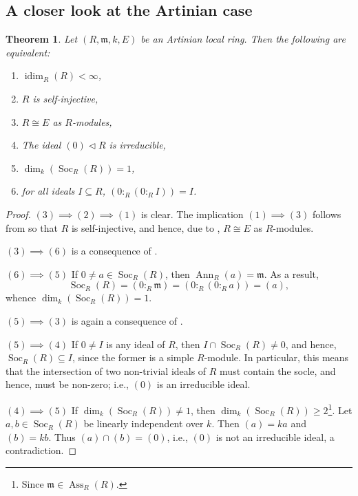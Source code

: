 \documentclass[10pt]{article}
\theoremstyle{thmstyle}
\newtheorem{theorem}{Theorem}[section]
\theoremstyle{defstyle}
\newcommand{\Ann}{\operatorname{Ann}}
\newcommand{\frakm}{\mathfrak{m}} %
\renewcommand{\ge}{\geqslant}
\newcommand{\idim}{\operatorname{idim}}
\newcommand{\nor}{\vartriangleleft}
\newcommand{\Soc}{\operatorname{Soc}}
\newcommand{\Ass}{\operatorname{Ass}}
\begin{document}
\subsection{A closer look at the Artinian case}

\begin{theorem}
    Let $(R,\frakm,k, E)$ be an Artinian local ring. Then the following are equivalent: 
    \begin{enumerate}[label=(\arabic*)]
        \item $\idim_R(R) < \infty$,
        \item $R$ is self-injective,
        \item $R\cong E$ as $R$-modules,
        \item The ideal $(0)\nor R$ is irreducible,
        \item $\dim_k\left(\Soc_R(R)\right) = 1$,
        \item for all ideals $I\subseteq R$, $\left(0 :_R \left(0 :_R I\right)\right) = I$.
    \end{enumerate}
\end{theorem}
\begin{proof}
    $(3)\implies(2)\implies(1)$ is clear. The implication $(1)\implies(3)$ follows from  so that $R$ is self-injective, and hence, due to , $R\cong E$ as $R$-modules.

    $(3)\implies(6)$ is a consequence of .

    $(6)\implies(5)$ If $0\ne a\in\Soc_R(R)$, then $\Ann_R(a) = \frakm$. As a result, 
    \begin{equation*}
        \Soc_R(R) = \left(0:_R \frakm\right) = \left(0:_R\left(0:_R a\right)\right) = (a),
    \end{equation*}
    whence $\dim_k\left(\Soc_R(R)\right) = 1$. 

    $(5)\implies(3)$ is again a consequence of .

    $(5)\implies(4)$ If $0\ne I$ is any ideal of $R$, then $I\cap\Soc_R(R)\ne 0$, and hence, $\Soc_R(R)\subseteq I$, since the former is a simple $R$-module. In particular, this means that the intersection of two non-trivial ideals of $R$ must contain the socle, and hence, must be non-zero; i.e., $(0)$ is an irreducible ideal. 

    $(4)\implies(5)$ If $\dim_k\left(\Soc_R(R)\right)\ne 1$, then $\dim_k\left(\Soc_R(R)\right)\ge 2$\footnote{Since $\frakm\in\Ass_R(R)$.}. Let $a,b\in\Soc_R(R)$ be linearly independent over $k$. Then $(a) = ka$ and $(b) = kb$. Thus $(a)\cap (b) = (0)$, i.e., $(0)$ is not an irreducible ideal, a contradiction.
\end{proof}
\end{document}
